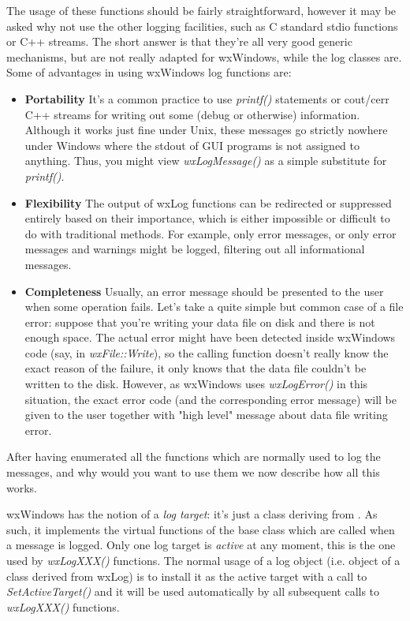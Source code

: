 The usage of these functions should be fairly straightforward, however it may
be asked why not use the other logging facilities, such as C standard stdio
functions or C++ streams. The short answer is that they're all very good
generic mechanisms, but are not really adapted for wxWindows, while the log
classes are. Some of advantages in using wxWindows log functions are:

\begin{itemize}\itemsep=0pt
\item{\bf Portability} It's a common practice to use {\it printf()} statements or
cout/cerr C++ streams for writing out some (debug or otherwise) information.
Although it works just fine under Unix, these messages go strictly nowhere
under Windows where the stdout of GUI programs is not assigned to anything.
Thus, you might view {\it wxLogMessage()} as a simple substitute for {\it
printf()}.
\item{\bf Flexibility} The output of wxLog functions can be redirected or
suppressed entirely based on their importance, which is either impossible or
difficult to do with traditional methods. For example, only error messages, or
only error messages and warnings might be logged, filtering out all
informational messages.
\item{\bf Completeness} Usually, an error message should be presented to the user
when some operation fails. Let's take a quite simple but common case of a file
error: suppose that you're writing your data file on disk and there is not
enough space. The actual error might have been detected inside wxWindows code
(say, in {\it wxFile::Write}), so the calling function doesn't really know the
exact reason of the failure, it only knows that the data file couldn't be
written to the disk. However, as wxWindows uses {\it wxLogError()} in this
situation, the exact error code (and the corresponding error message) will be
given to the user together with "high level" message about data file writing
error.
\end{itemize}

After having enumerated all the functions which are normally used to log the
messages, and why would you want to use them we now describe how all this
works.

wxWindows has the notion of a {\it log target}: it's just a class deriving
from . As such, it implements the virtual functions of
the base class which are called when a message is logged. Only one log target
is {\it active} at any moment, this is the one used by {\it wxLogXXX()}
functions. The normal usage of a log object (i.e. object of a class derived
from wxLog) is to install it as the active target with a call to {\it
SetActiveTarget()} and it will be used automatically by all subsequent calls
to {\it wxLogXXX()} functions.

